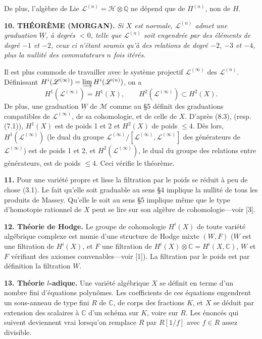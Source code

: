 \documentclass[8pt]{extarticle}
\newcommand{\NumPara}[1]{\par\noindent\textbf{#1}\enspace}
\newcommand{\TheoremPara}[1]{\par\noindent\textbf{#1}\enspace\itshape}
\newcommand{\EndTheorem}{\par\normalfont}
\newcommand{\Q}{\mathbb{Q}}
\newcommand{\C}{\mathbb{C}}
\newcommand{\Wg}{\underline{W}}
\newcommand{\Mmin}{\mathscr{M}}
\newcommand{\LieH}{\mathscr{H}}
\newcommand{\LieL}{\mathscr{L}}
\begin{document}
De plus, l'algèbre de Lie \(\LieL^{(n)}=\LieH\otimes\Q\) ne dépend que de \(\Pi^{(n)}\), non de \(H\).

\TheoremPara{10. THÉORÈME (MORGAN).} Si \(X\) est normale, \(\LieL^{(n)}\) admet une graduation \(\Wg\), à degrés \(<0\), telle que \(\LieL^{(n)}\) soit engendrée par des éléments de degré \(-1\) et \(-2\), ceux ci n'étant soumis qu'à des relations de degré \(-2\), \(-3\) et \(-4\), plus la nullité des commutateurs \(n\) fois itérés.\EndTheorem

Il est plus commode de travailler avec le système projectif \(\LieL^{(\infty)}\) des \(\LieL^{(n)}\). Définissant \(H^i(\LieL^{(\infty)})=\varinjlim H^i(\LieL^{(n)})\), on a
\[
H^1(\LieL^{(\infty)})=H^1(X),\qquad H^2(\LieL^{(\infty)})\subset H^2(X).
\]
De plus, une graduation \(\Wg\) de \(\Mmin\) comme au §5 définit des graduations compatibles de \(\LieL^{(\infty)}\), de sa cohomologie, et de celle de \(X\). D'après (8.3), (resp. (7.1)), \(H^1(X)\) est de poids 1 et 2 et \(H^2(X)\) de poids \(\le4\). Dès lors, \(H^1(\LieL^{(\infty)})\) (le dual du groupe \(\LieL^{(\infty)}/[\LieL^{(\infty)},\LieL^{(\infty)}]\) des générateurs de \(\LieL^{(\infty)}\)) est de poids 1 et 2, et \(H^2(\LieL^{(\infty)})\), le dual du groupe des relations entre générateurs, est de poids \(\le4\). Ceci vérifie le théorème.

\NumPara{11.} Pour une variété propre et lisse la filtration par le poids se réduit à peu de chose (3.1). Le fait qu'elle soit graduable au sens §4 implique la nullité de tous les produits de Massey. Qu'elle le soit au sens §5 implique même que le type d'homotopie rationnel de \(X\) peut se lire sur son algèbre de cohomologie---voir [3].

\NumPara{12. Théorie de Hodge.} Le groupe de cohomologie \(H^i(X)\) de toute variété algébrique complexe est munie d'une structure de Hodge mixte \((W,F)\) (\(W\) est une filtration de \(H^i(X)\), et \(F\) une filtration de \(H^i(X)\otimes\C=H^i(X,\C)\), \(W\) et \(F\) vérifiant des axiomes convenables---voir [1]). La filtration par le poids est par définition la filtration \(W\).

\NumPara{13. Théorie \(l\)-adique.} Une variété algébrique \(X\) se définit en terme d'un nombre fini d'équations polynômes. Les coefficients de ces équations engendrent un sous-anneau de type fini \(R\) de \(\C\), de corps des fractions \(K\), et \(X\) se déduit par extension des scalaires à \(\C\) d'un schéma sur \(K\), voire sur \(R\). Les énoncés qui suivent deviennent vrai lorsqu'on remplace \(R\) par \(R[1/f]\) avec \(f\in R\) assez divisible.
\end{document}
